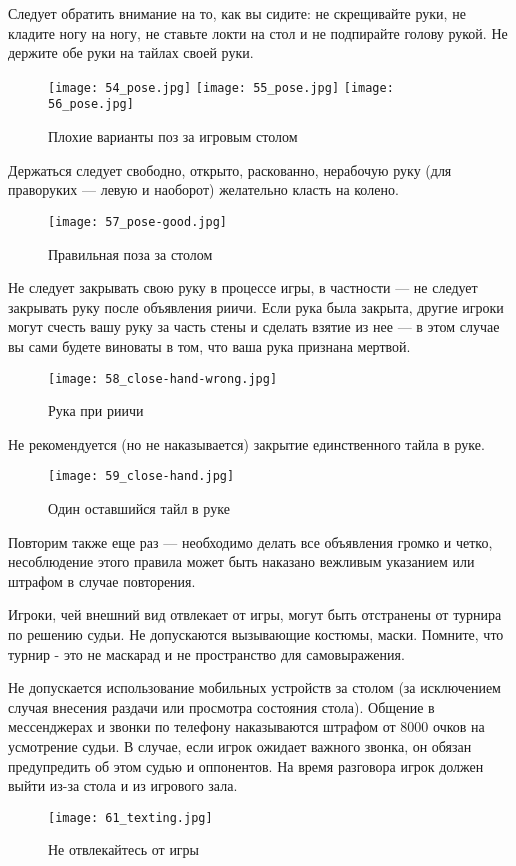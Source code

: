 Следует обратить внимание на то, как вы сидите: не скрещивайте руки, не кладите ногу на ногу, не ставьте локти на стол и не подпирайте голову рукой. Не держите обе руки на тайлах своей руки.

\begin{figure}[H]
	\centering
	\texttt{[image: 54\_pose.jpg]}
	\texttt{[image: 55\_pose.jpg]}
	\texttt{[image: 56\_pose.jpg]}
	\caption{Плохие варианты поз за игровым столом}
\end{figure}

Держаться следует свободно, открыто, раскованно, нерабочую руку (для праворуких — левую и наоборот) желательно класть на колено.

\begin{figure}[H]
	\centering
	\texttt{[image: 57\_pose-good.jpg]}
	\caption{Правильная поза за столом}
\end{figure}

Не следует закрывать свою руку в процессе игры, в частности --- не следует закрывать руку после объявления риичи. Если рука была закрыта, другие игроки могут счесть вашу руку за часть стены и сделать взятие из нее --- в этом случае вы сами будете виноваты в том, что ваша рука признана мертвой.

\begin{figure}[H]
	\centering
	\texttt{[image: 58\_close-hand-wrong.jpg]}
	\caption{Рука при риичи}
\end{figure}

Не рекомендуется (но не наказывается) закрытие единственного тайла в руке.

\begin{figure}[H]
	\centering
	\texttt{[image: 59\_close-hand.jpg]}
	\caption{Один оставшийся тайл в руке}
\end{figure}

Повторим также еще раз --- необходимо делать все объявления громко и четко, несоблюдение этого правила может быть наказано вежливым указанием или штрафом в случае повторения.

Игроки, чей внешний вид отвлекает от игры, могут быть отстранены от турнира по решению судьи. Не допускаются вызывающие костюмы, маски. Помните, что турнир - это не маскарад и не пространство для самовыражения.

Не допускается использование мобильных устройств за столом (за исключением случая внесения раздачи или просмотра состояния стола). Общение в мессенджерах и звонки по телефону наказываются штрафом от 8000 очков на усмотрение судьи. В случае, если игрок ожидает важного звонка, он обязан предупредить об этом судью и оппонентов. На время разговора игрок должен выйти из-за стола и из игрового зала.

\begin{figure}[H]
	\centering
	\texttt{[image: 61\_texting.jpg]}
	\caption{Не отвлекайтесь от игры}
\end{figure}